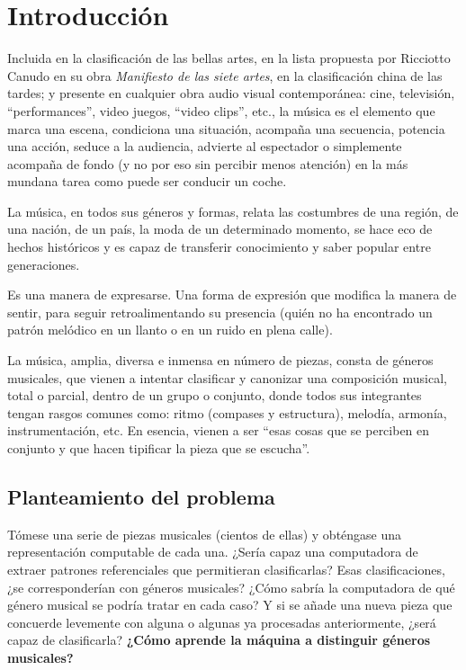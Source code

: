 
\cleardoublepage

\chapter{Introducción}

Incluida en la clasificación de las bellas artes, en la lista propuesta por Ricciotto Canudo en su obra \emph{Manifiesto de las siete artes}, en la clasificación china de las tardes; y presente en cualquier obra audio visual contemporánea: cine, televisión, ``performances'', video juegos, ``video clips'', etc., la música es el elemento que marca una escena, condiciona una situación, acompaña una secuencia, potencia una acción, seduce a la audiencia, advierte al espectador o simplemente acompaña de fondo (y no por eso sin percibir menos atención) en la más mundana tarea como puede ser conducir un coche.

La música, en todos sus géneros y formas, relata las costumbres de una región, de una nación, de un país, la moda de un determinado momento, se hace eco de hechos históricos y es capaz de transferir conocimiento y saber popular entre generaciones.

Es una manera de expresarse. Una forma de expresión que modifica la manera de sentir, para seguir retroalimentando su presencia (quién no ha encontrado un patrón melódico en un llanto o en un ruido en plena calle).

La música, amplia, diversa e inmensa en número de piezas, consta de géneros musicales, que vienen a intentar clasificar y canonizar una composición musical, total o parcial, dentro de un grupo o conjunto, donde todos sus integrantes tengan rasgos comunes como: ritmo (compases y estructura), melodía, armonía, instrumentación, etc. En esencia, vienen a ser ``esas cosas que se perciben en conjunto y que hacen tipificar la pieza que se escucha''.

\section{Planteamiento del problema}

Tómese una serie de piezas musicales (cientos de ellas) y obténgase una representación computable de cada una. ¿Sería capaz una computadora de extraer patrones referenciales que permitieran clasificarlas? Esas clasificaciones, ¿se corresponderían con géneros musicales? ¿Cómo sabría la computadora de qué género musical se podría tratar en cada caso? Y si se añade una nueva pieza que concuerde levemente con alguna o algunas ya procesadas anteriormente, ¿será capaz de clasificarla? \textbf{¿Cómo aprende la máquina a distinguir géneros musicales?}

